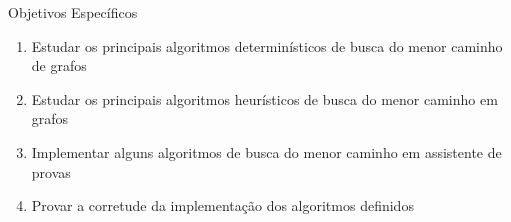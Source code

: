 \begin{frame}{Objetivos Específicos}
    \begin{enumerate}
        \item Estudar os principais algoritmos determinísticos de busca do menor caminho de grafos
        \item Estudar os principais algoritmos heurísticos de busca do menor caminho em grafos
        \item Implementar alguns algoritmos de busca do menor caminho em assistente de provas
        \item Provar a corretude da implementação dos algoritmos definidos
    \end{enumerate}
\end{frame}